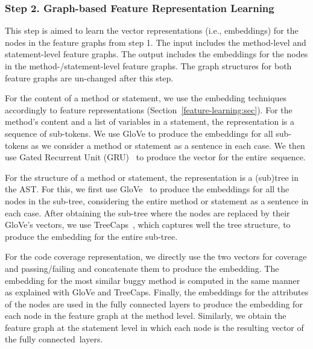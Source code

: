 \subsubsection{Step 2. Graph-based Feature Representation
  Learning}

This step is aimed to learn the vector representations (i.e.,
embeddings) for the nodes in the feature graphs from step 1. The input
includes the method-level and statement-level feature graphs. The
output includes the embeddings for the nodes in the
method-/statement-level feature graphs. The graph structures for both
feature graphs are un-changed after this step.

For the content of a method or statement, we use the
embedding techniques accordingly to feature representations
(Section~\ref{feature-learning:sec}). For the method's content and a
list of variables in a statement, the representation is a sequence of
sub-tokens. We use GloVe \cite{glove2014} to produce the embeddings
for all sub-tokens as we consider a method or statement as a sentence
in each case. We then use Gated Recurrent Unit (GRU)~\cite{GRU-cho14}
to produce the vector for the entire~sequence.

For the structure of a method or statement, the representation is a
(sub)tree in the AST. For this, we first use GloVe~\cite{glove2014} to
produce the embeddings for all the nodes in the sub-tree, considering
the entire method or statement as a sentence in each case. After
obtaining the sub-tree where the nodes are replaced by their GloVe's
vectors, we use TreeCaps~\cite{bui2021treecaps}, which captures well
the tree structure, to produce the embedding for the entire sub-tree.

For the code coverage representation, we directly use the two vectors
for coverage and passing/failing and concatenate them to produce the
embedding. The embedding for the most similar buggy method is computed
in the same manner as explained with GloVe and TreeCaps. Finally, the
embeddings for the attributes of the nodes are used in the fully
connected layers to produce the embedding for each node in the feature
graph at the method level. Similarly, we obtain the feature graph at
the statement level in which each node is the resulting vector of the
fully connected~layers.

